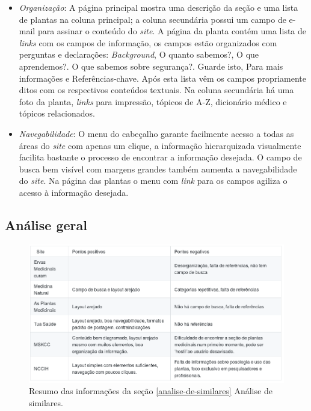 \begin{itemize}
\item
  \emph{Organização}: A página principal mostra uma descrição da seção e uma lista de plantas na coluna principal; a coluna secundária possui um campo de e-mail para assinar o conteúdo do \emph{site}. A página da planta contém uma lista de \emph{links} com os campos de informação, os campos estão organizados com perguntas e declarações: \emph{Background}, O quanto sabemos?, O que aprendemos?. O que sabemos sobre segurança?. Guarde isto, Para mais informações e Referências-chave. Após esta lista vêm os campos propriamente ditos com os respectivos conteúdos textuais. Na coluna secundária há uma foto da planta, \emph{links} para impressão, tópicos de A-Z, dicionário médico e tópicos relacionados.
\item
  \emph{Navegabilidade}: O menu do cabeçalho garante facilmente acesso a todas as áreas do \emph{site} com apenas um clique, a informação hierarquizada visualmente facilita bastante o processo de encontrar a informação desejada. O campo de busca bem visível com margens grandes também aumenta a navegabilidade do \emph{site}. Na página das plantas o menu com \emph{link} para os campos agiliza o acesso à informação desejada.
\end{itemize}

\subsection{Análise geral}\label{analise-geral}

\begin{figure}
\centering
\caption{\label{tabela-sim}Resumo das informações da seção \ref{analise-de-similares} Análise de similares.}
\includegraphics[width=\textwidth]{images/similares/tabela-sim.png}
\end{figure}

